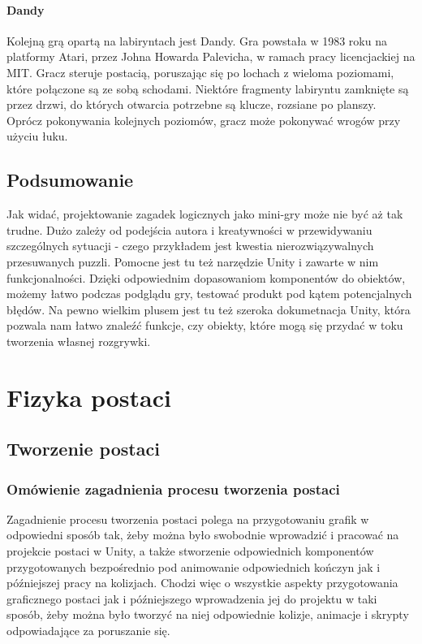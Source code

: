 \documentclass[oneside,polski,logo]{amuthesis}
\begin{document}
\subsubsection{Dandy}
Kolejną grą opartą na labiryntach jest Dandy. Gra powstała w 1983 roku na platformy Atari, przez Johna Howarda Palevicha, w ramach pracy licencjackiej na MIT. Gracz steruje postacią, poruszając się po lochach z wieloma poziomami, które połączone są ze sobą schodami. Niektóre fragmenty labiryntu zamknięte są przez drzwi, do których otwarcia potrzebne są klucze, rozsiane po planszy. Oprócz pokonywania kolejnych poziomów, gracz może pokonywać wrogów przy użyciu łuku. \cite{Dandy}
\section{Podsumowanie}
Jak widać, projektowanie zagadek logicznych jako mini-gry może nie być aż tak trudne. Dużo zależy od podejścia autora i kreatywności w przewidywaniu szczególnych sytuacji - czego przykładem jest kwestia nierozwiązywalnych przesuwanych puzzli. Pomocne jest tu też narzędzie Unity i zawarte w nim funkcjonalności. Dzięki odpowiednim dopasowaniom komponentów do obiektów, możemy łatwo podczas podglądu gry, testować produkt pod kątem potencjalnych błędów. Na pewno wielkim plusem jest tu też szeroka dokumetnacja Unity, która pozwala nam łatwo znaleźć funkcje, czy obiekty, które mogą się przydać w toku tworzenia własnej rozgrywki.
\chapter{Fizyka postaci}
\section{Tworzenie postaci}
\subsection{Omówienie zagadnienia procesu tworzenia postaci}
Zagadnienie procesu tworzenia postaci polega na przygotowaniu grafik w odpowiedni sposób tak, żeby można było swobodnie wprowadzić i pracować na projekcie postaci w Unity, a także stworzenie odpowiednich komponentów przygotowanych bezpośrednio pod animowanie odpowiednich kończyn jak i późniejszej pracy na kolizjach. Chodzi więc o wszystkie aspekty przygotowania graficznego postaci jak i późniejszego wprowadzenia jej do projektu w taki sposób, żeby można było tworzyć na niej odpowiednie kolizje, animacje i skrypty odpowiadające za poruszanie się.
\end{document}
